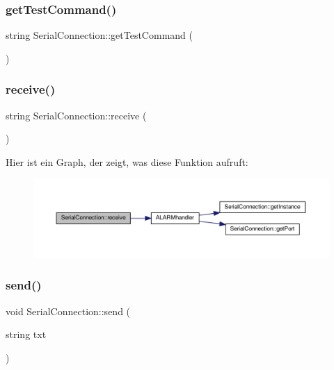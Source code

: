 \subsubsection{get\+Test\+Command()}
{\footnotesize\ttfamily string Serial\+Connection\+::get\+Test\+Command (\begin{DoxyParamCaption}{ }\end{DoxyParamCaption})}

\mbox{\label{class_serial_connection_a6419c43953bb392053479353420a1f8e}} 
\subsubsection{receive()}
{\footnotesize\ttfamily string Serial\+Connection\+::receive (\begin{DoxyParamCaption}{ }\end{DoxyParamCaption})}

Hier ist ein Graph, der zeigt, was diese Funktion aufruft\+:\nopagebreak
\begin{figure}[H]
\begin{center}
\leavevmode
\includegraphics[width=350pt]{class_serial_connection_a6419c43953bb392053479353420a1f8e_cgraph}
\end{center}
\end{figure}
\mbox{\label{class_serial_connection_a31a09de5479fb612aac94ade315d6f0e}} 
\subsubsection{send()}
{\footnotesize\ttfamily void Serial\+Connection\+::send (\begin{DoxyParamCaption}\item[{string}]{txt }\end{DoxyParamCaption})}

